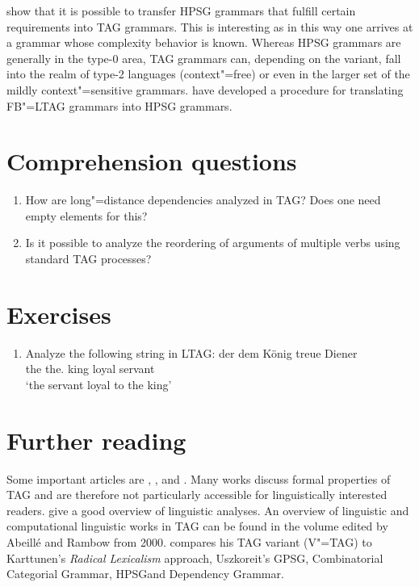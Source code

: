 \citet*{KKNV95a} show that it is possible to transfer HPSG grammars that fulfill certain requirements into TAG grammars. This is interesting
as in this way one arrives at a grammar whose complexity behavior is known. Whereas HPSG grammars are generally
in the type-0 area, TAG grammars can, depending on the variant, fall into the realm of type-2 languages (context"=free) or even in the
larger set of the mildly context"=sensitive grammars. \citet*{YMTT2001a} have developed a procedure for translating FB"=LTAG grammars into
HPSG grammars.


\section*{Comprehension questions}

\begin{enumerate}
\item How are long"=distance dependencies analyzed in TAG? Does one need empty elements for this?
\item Is it possible to analyze the reordering of arguments of multiple verbs using standard TAG processes?
\end{enumerate} 

\section*{Exercises}

\begin{enumerate}
\item Analyze the following string in LTAG:
\ea
\gll der dem König treue Diener\\
	 the the.\dat{} king loyal servant\\
\glt `the servant loyal to the king'
\z
\end{enumerate}

\section*{Further reading}

Some important articles are , , and . Many works discuss formal properties of TAG and are therefore not particularly accessible for
linguistically interested readers.  give a good overview of linguistic analyses. An overview of linguistic and computational linguistic
works in TAG can be found in the volume edited by Abeill{\'e} and
Rambow\nocite{AR2000a-ed} from 2000. \citet{Rambow94a} compares his TAG variant (V"=TAG) to Karttunen's \emph{Radical Lexicalism} approach, Uszkoreit's GPSG\indexgpsg,
Combinatorial Categorial Grammar\indexcg, HPSG\indexhpsg and
Dependency Grammar\indexdg. 

